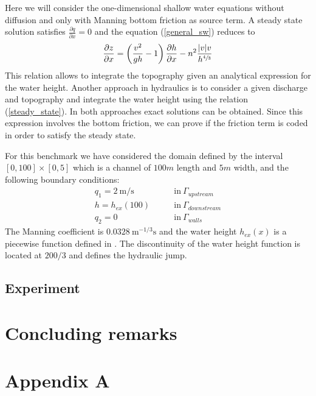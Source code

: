 \documentclass[a4paper,12pt]{article}
\newcommand{\pder}[2]{\frac{\partial#1}{\partial#2}}
\newcommand{\abs}[1]{\lvert#1\rvert}
\begin{document}
Here we will consider the one-dimensional shallow water equations without diffusion and only with Manning bottom friction as source term. A steady state solution satisfies $\pder{q}{x}=0$ and the equation (\ref{general_sw}) reduces to
\begin{equation} \label{steady_state}
\pder{z}{x} = \left(\frac{v^2}{gh}-1\right) \pder{h}{x} - n^2\frac{\abs{v}v}{h^{\sfrac{4}{3}}}
\end{equation}
This relation allows to integrate the topography given an analytical expression for the water height. Another approach in hydraulics is to consider a given discharge and topography and integrate the water height using the relation (\ref{steady_state}). In both approaches exact solutions can be obtained. Since this expression involves the bottom friction, we can prove if the friction term is coded in order to satisfy the steady state.

For this benchmark we have considered the domain defined by the interval $[0,100]\times[0,5]$ which is a channel of $100m$ length and $5m$ width, and the following boundary conditions:
\begin{equation}
\begin{split}
    q_1 = 2\ \text{m/s} \qquad &\text{in} \ \Gamma_{upstream} \\
    h = h_{ex}(100) \qquad &\text{in} \ \Gamma_{downstream} \\
    q_2 = 0 \qquad &\text{in} \ \Gamma_{walls}
\end{split}
\end{equation}
The Manning coefficient is $0.0328\ \text{m}^{-1/3}\text{s}$ and the water height $h_{ex}(x)$ is a piecewise function defined in \cite{delestre2013}. The discontinuity of the water height function is located at $200/3$ and defines the hydraulic jump.


\subsection{Experiment}


\section{Concluding remarks} \label{sec:conclusions}


\section*{Appendix A}
\end{document}
